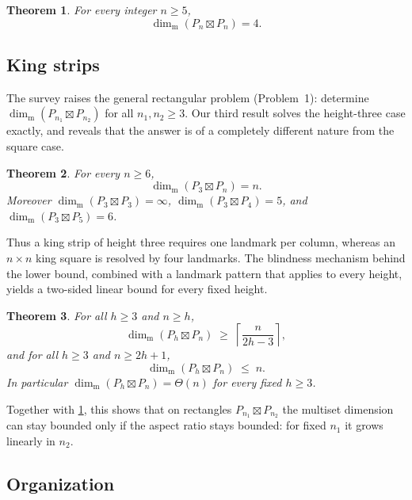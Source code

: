 \documentclass[11pt]{amsart}
\newtheorem{theorem}{Theorem}[section]
\theoremstyle{remark}
\newcommand{\mdim}{\operatorname{dim}_{\mathrm m}}
\begin{document}
\begin{theorem}\label{thm:square}
For every integer $n\ge 5$,
\[
 \mdim(P_n\boxtimes P_n)=4.
\]
\end{theorem}

\subsection{King strips}

The survey \cite{FarhanEtAl2026} raises the general rectangular problem (Problem~1): determine $\mdim(P_{n_1}\boxtimes P_{n_2})$ for all $n_1,n_2\ge 3$.  Our third result solves the height-three case exactly, and reveals that the answer is of a completely different nature from the square case.

\begin{theorem}\label{thm:strip}
For every $n\ge 6$,
\[
 \mdim(P_3\boxtimes P_n)=n .
\]
Moreover $\mdim(P_3\boxtimes P_3)=\infty$, $\mdim(P_3\boxtimes P_4)=5$, and $\mdim(P_3\boxtimes P_5)=6$.
\end{theorem}

Thus a king strip of height three requires one landmark per column, whereas an $n\times n$ king square is resolved by four landmarks.  The blindness mechanism behind the lower bound, combined with a landmark pattern that applies to every height, yields a two-sided linear bound for every fixed height.

\begin{theorem}\label{thm:strips}
For all $h\ge 3$ and $n\ge h$,
\[
 \mdim(P_h\boxtimes P_n)\;\ge\;\left\lceil\frac{n}{2h-3}\right\rceil,
\]
and for all $h\ge 3$ and $n\ge 2h+1$,
\[
 \mdim(P_h\boxtimes P_n)\;\le\;n .
\]
In particular $\mdim(P_h\boxtimes P_n)=\Theta(n)$ for every fixed $h\ge 3$.
\end{theorem}

Together with \cref{thm:square}, this shows that on rectangles $P_{n_1}\boxtimes P_{n_2}$ the multiset dimension can stay bounded only if the aspect ratio stays bounded: for fixed $n_1$ it grows linearly in $n_2$.

\subsection{Organization}
\end{document}
